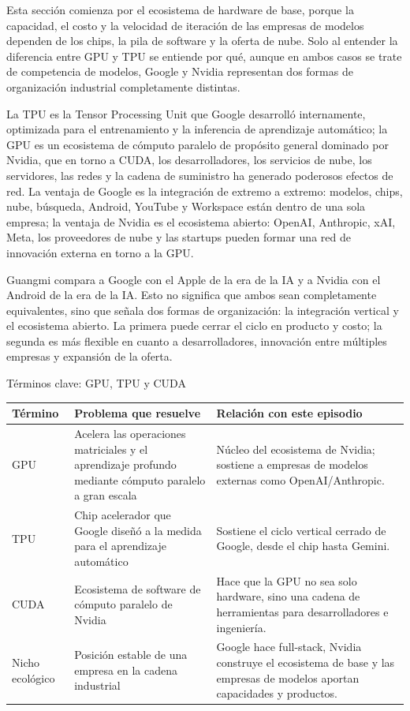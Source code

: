 \documentclass[a4paper]{article}
\begin{document}
Esta sección comienza por el ecosistema de hardware de base, porque la capacidad, el costo y la velocidad de iteración de las empresas de modelos dependen de los chips, la pila de software y la oferta de nube. Solo al entender la diferencia entre GPU y TPU se entiende por qué, aunque en ambos casos se trate de competencia de modelos, Google y Nvidia representan dos formas de organización industrial completamente distintas.

La TPU es la Tensor Processing Unit que Google desarrolló internamente, optimizada para el entrenamiento y la inferencia de aprendizaje automático; la GPU es un ecosistema de cómputo paralelo de propósito general dominado por Nvidia, que en torno a CUDA, los desarrolladores, los servicios de nube, los servidores, las redes y la cadena de suministro ha generado poderosos efectos de red. La ventaja de Google es la integración de extremo a extremo: modelos, chips, nube, búsqueda, Android, YouTube y Workspace están dentro de una sola empresa; la ventaja de Nvidia es el ecosistema abierto: OpenAI, Anthropic, xAI, Meta, los proveedores de nube y las startups pueden formar una red de innovación externa en torno a la GPU.

Guangmi compara a Google con el Apple de la era de la IA y a Nvidia con el Android de la era de la IA. Esto no significa que ambos sean completamente equivalentes, sino que señala dos formas de organización: la integración vertical y el ecosistema abierto. La primera puede cerrar el ciclo en producto y costo; la segunda es más flexible en cuanto a desarrolladores, innovación entre múltiples empresas y expansión de la oferta.

\begin{knowledgebox}{Términos clave: GPU, TPU y CUDA}
\begin{tabularx}{\textwidth}{p{}p{}X}
\toprule
Término & Problema que resuelve & Relación con este episodio \\
\midrule
GPU & Acelera las operaciones matriciales y el aprendizaje profundo mediante cómputo paralelo a gran escala & Núcleo del ecosistema de Nvidia; sostiene a empresas de modelos externas como OpenAI/Anthropic. \\
TPU & Chip acelerador que Google diseñó a la medida para el aprendizaje automático & Sostiene el ciclo vertical cerrado de Google, desde el chip hasta Gemini. \\
CUDA & Ecosistema de software de cómputo paralelo de Nvidia & Hace que la GPU no sea solo hardware, sino una cadena de herramientas para desarrolladores e ingeniería. \\
Nicho ecológico & Posición estable de una empresa en la cadena industrial & Google hace full-stack, Nvidia construye el ecosistema de base y las empresas de modelos aportan capacidades y productos. \\
\bottomrule
\end{tabularx}
\end{knowledgebox}
\end{document}
